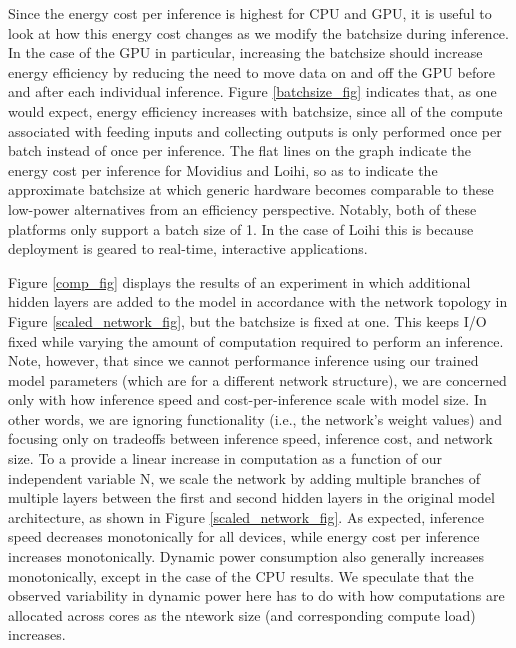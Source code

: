 \documentclass{article}
\begin{document}
Since the energy cost per inference is highest for CPU and GPU, it is useful to look at how this energy cost changes as we modify the batchsize during inference. In the case of the GPU in particular, increasing the batchsize should increase energy efficiency by reducing the need to move data on and off the GPU before and after each individual inference. Figure \ref{batchsize_fig} indicates that, as one would expect, energy efficiency increases with batchsize, since all of the compute associated with feeding inputs and collecting outputs is only performed once per batch instead of once per inference. The flat lines on the graph indicate the energy cost per inference for Movidius and Loihi, so as to indicate the approximate batchsize at which generic hardware becomes comparable to these low-power alternatives from an efficiency perspective. Notably, both of these platforms only support a batch size of 1. In the case of Loihi this is because deployment is geared to real-time, interactive applications.

Figure \ref{comp_fig} displays the results of an experiment in which additional hidden layers are added to the model in accordance with the network topology in Figure \ref{scaled_network_fig}, but the batchsize is fixed at one. This keeps I/O fixed while varying the amount of computation required to perform an inference. Note, however, that since we cannot performance inference using our trained model parameters (which are for a different network structure), we are concerned only with how inference speed and cost-per-inference scale with model size. In other words, we are ignoring functionality (i.e., the network's weight values) and focusing only on tradeoffs between inference speed, inference cost, and network size. To a provide a linear increase in computation as a function of our independent variable N, we scale the network by adding multiple branches of multiple layers between the first and second hidden layers in the original model architecture, as shown in Figure \ref{scaled_network_fig}. As expected, inference speed decreases monotonically for all devices, while energy cost per inference increases monotonically. Dynamic power consumption also generally increases monotonically, except in the case of the CPU results. We speculate that the observed variability in dynamic power here has to do with how computations are allocated across cores as the ntework size (and corresponding compute load) increases.
\end{document}
